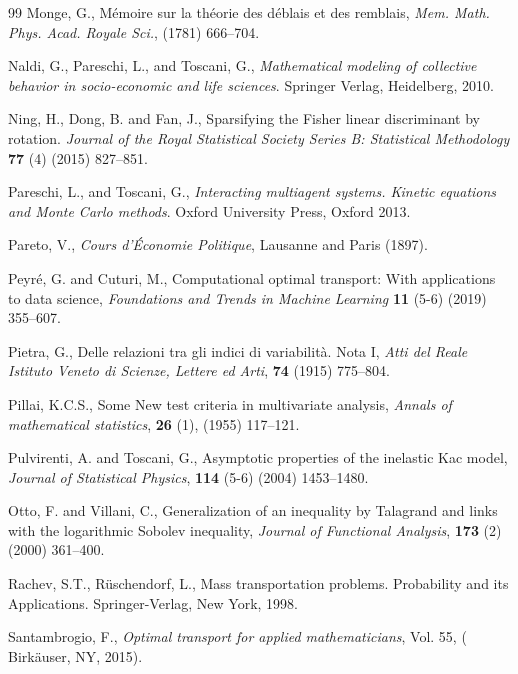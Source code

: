 \documentclass{article}
\begin{document}
\begin{thebibliography}{99}
Monge, G.,
  {M{\'e}moire sur la th{\'e}orie des d{\'e}blais et des remblais},
  \textit{Mem. Math. Phys. Acad. Royale Sci.}, (1781)
  {666--704}.

  
Naldi, G., Pareschi, L., and Toscani, G., \newblock \emph{Mathematical modeling of collective behavior in socio-economic and life sciences}. \newblock Springer Verlag, Heidelberg, 2010.

Ning, H., Dong, B.  and  Fan, J., Sparsifying the Fisher linear discriminant by rotation. \emph{Journal of the Royal Statistical Society Series B: Statistical Methodology} \textbf{77} (4) (2015) 827--851.

Pareschi, L., and Toscani, G.,
\newblock \emph{Interacting multiagent systems. Kinetic equations and Monte
  Carlo methods}.
\newblock Oxford University Press, Oxford 2013.

Pareto, V.,
  \emph{Cours d'{\'E}conomie Politique},  Lausanne and Paris (1897).

Peyr\'e, G. and Cuturi, M., Computational optimal transport: {W}ith applications to data science, \textit{Foundations and Trends in Machine Learning} \textbf{11} (5-6) (2019) 355--607. 

Pietra, G.,  Delle relazioni tra gli indici di variabilit\`a. Nota I, \textit{Atti del Reale Istituto Veneto di Scienze, Lettere ed Arti}, \textbf{74}  (1915) 775--804.

Pillai, K.C.S., Some New test criteria in multivariate analysis, \emph{Annals of mathematical statistics}, \textbf{26} (1), (1955) 117--121.
     
Pulvirenti, A. and Toscani, G., Asymptotic properties of the inelastic Kac model, \emph{Journal of Statistical Physics}, \textbf{114} (5-6) (2004) 1453--1480.

Otto, F. and Villani, C.,
Generalization of an inequality by {T}alagrand and links with the logarithmic {S}obolev inequality, 
\textit{Journal of Functional Analysis}, \textbf{173} (2) (2000) 361--400.

Rachev, S.T., R\"uschendorf, L., Mass transportation problems. Probability and its Applications. Springer-Verlag, New York, 1998.

 Santambrogio, F.,   
 \textit{Optimal transport for applied mathematicians},
  Vol. 55, ( Birk{\"a}user, NY, 2015).
  

\end{thebibliography}
\end{document}
